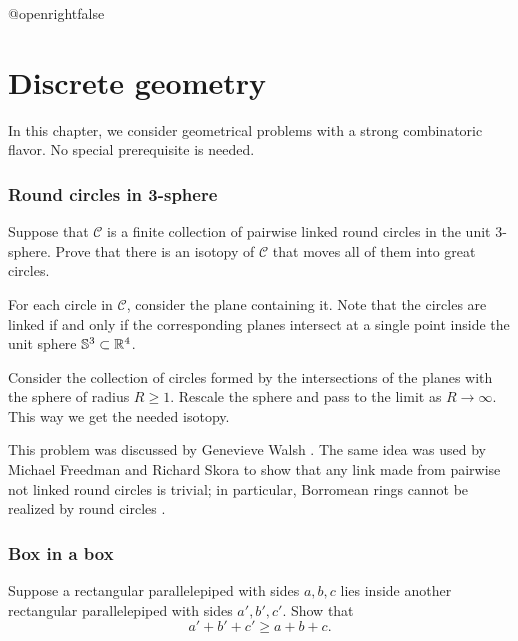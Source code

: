 \csname @openrightfalse\endcsname
\chapter{Discrete geometry}

In this chapter, we consider geometrical problems with a strong combinatoric flavor.
No special prerequisite is needed.

\subsection*{Round circles in 3-sphere}\label{Round circles}

\begin{pr}
Suppose that $\mathcal{C}$ is a finite collection of pairwise linked round circles in the unit 3-sphere. 
Prove that there is an isotopy of $\mathcal{C}$ that moves all of them into great circles.
\end{pr}


For each circle in $\mathcal{C}$, consider the plane containing it.
Note that the circles are linked 
if and only if 
the corresponding planes intersect at a single point inside the unit sphere $\mathbb{S}^3\subset \mathbb{R}^4$.

Consider the collection of circles formed by the intersections of the planes with the sphere of radius $R\ge 1$.
Rescale the sphere and pass to the limit as $R\to\infty$.  
This way we get the needed isotopy.\qeds

This problem was discussed 
by Genevieve Walsh \cite{walsh}.
The same idea was used by Michael Freedman and  Richard Skora to show that any link made from pairwise not linked round circles is trivial; 
in particular, Borromean rings cannot be realized by round circles
\cite[see Lemma 3.2 in ][]{freedman-skora}.

\subsection*{Box in a box}\label{box-in-box}

\begin{pr}
Suppose a rectangular parallelepiped with sides $a,b,c$ 
lies inside another rectangular parallelepiped with sides $a',b',c'$. 
Show that 
\[a'+b'+c'\ge a+b+c.\]

\end{pr}

